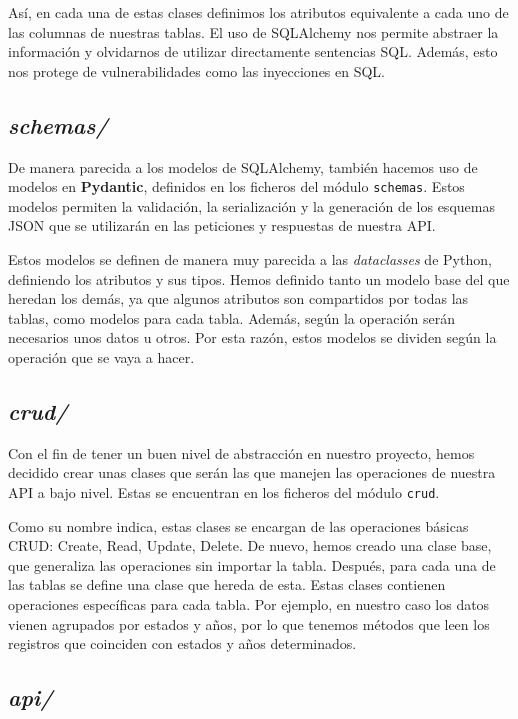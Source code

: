 \documentclass[11pt,a4paper]{article}
\begin{document}
Así, en cada una de estas clases definimos los atributos equivalente a cada uno de las columnas de nuestras tablas. El uso de SQLAlchemy nos permite abstraer la información y olvidarnos de utilizar directamente sentencias SQL. Además, esto nos protege de vulnerabilidades como las inyecciones en SQL.

\subsection*{\textit{schemas/}}

De manera parecida a los modelos de SQLAlchemy, también hacemos uso de modelos en \textbf{Pydantic}, definidos en los ficheros del módulo \lstinline!schemas!. Estos modelos permiten la validación, la serialización y la generación de los esquemas JSON que se utilizarán en las peticiones y respuestas de nuestra API.

Estos modelos se definen de manera muy parecida a las \textit{dataclasses} de Python, definiendo los atributos y sus tipos. Hemos definido tanto un modelo base del que heredan los demás, ya que algunos atributos son compartidos por todas las tablas, como modelos para cada tabla. Además, según la operación serán necesarios unos datos u otros. Por esta razón, estos modelos se dividen según la operación que se vaya a hacer.

\subsection*{\textit{crud/}}

Con el fin de tener un buen nivel de abstracción en nuestro proyecto, hemos decidido crear unas clases que serán las que manejen las operaciones de nuestra API a bajo nivel. Estas se encuentran en los ficheros del módulo \lstinline!crud!.

Como su nombre indica, estas clases se encargan de las operaciones básicas CRUD: Create, Read, Update, Delete. De nuevo, hemos creado una clase base, que generaliza las operaciones sin importar la tabla. Después, para cada una de las tablas se define una clase que hereda de esta. Estas clases contienen operaciones específicas para cada tabla. Por ejemplo, en nuestro caso los datos vienen agrupados por estados y años, por lo que tenemos métodos que leen los registros que coinciden con estados y años determinados.

\subsection*{\textit{api/}}
\end{document}
